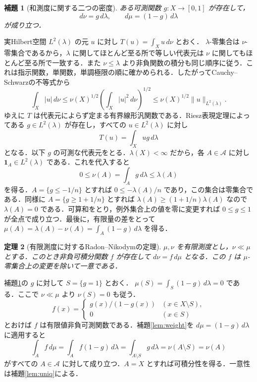 \documentclass[a5paper,10pt,onecolumn]{jsarticle}
\makeatletter
\theoremstyle{mathnotetheorem}
\newtheorem{theorem}{定理}[section]
\newtheorem{lemma}[theorem]{補題}
\renewcommand{\proofname}{証明}
\renewenvironment{proof}[1][\proofname]{%
  \par\pushQED{\qed}\normalfont\topsep4\p@\@plus2\p@\relax
  \trivlist\item[\hskip\labelsep\bfseries #1]\ignorespaces
}{\popQED\endtrivlist\@endpefalse}
\makeatother
\begin{document}
\begin{lemma}[和測度に関する二つの密度]\label{lem:sum}
ある可測関数 $g:X\to[0,1]$ が存在して，
\[
                 d\nu=g\,d\lambda,\qquad d\mu=(1-g)\,d\lambda
\]
が成り立つ．
\end{lemma}
\begin{proof}
実Hilbert空間 $L^2(\lambda)$ の元 $u$ に対し $T(u)=\int_X u\,d\nu$ とおく．
$\lambda$-零集合は $\nu$-零集合であるから，$\lambda$ に関してほとんど至る所で等しい代表元は $\nu$ に関してもほとんど至る所で一致する．また $\nu\le\lambda$ より非負関数の積分も同じ順序に従う．これは指示関数，単関数，単調極限の順に確かめられる．したがってCauchy--Schwarzの不等式から
\[
      \int_X |u|\,d\nu
       \le \nu(X)^{1/2}\left(\int_X |u|^2\,d\nu\right)^{1/2}
       \le \nu(X)^{1/2}\|u\|_{L^2(\lambda)} .
\]
ゆえに $T$ は代表元によらず定まる有界線形汎関数である．Riesz表現定理によってある $g\in L^2(\lambda)$ が存在し，すべての $u\in L^2(\lambda)$ に対し
\[
                    T(u)=\int_X ug\,d\lambda
\]
となる．以下 $g$ の可測な代表元をとる．$\lambda(X)<\infty$ だから，各 $A\in\mathcal A$ に対し $\mathbf1_A\in L^2(\lambda)$ である．これを代入すると
\[
             0\le \nu(A)=\int_A g\,d\lambda\le\lambda(A)
\]
を得る．$A=\{g\le-1/n\}$ とすれば $0\le-\lambda(A)/n$ であり，この集合は零集合である．同様に $A=\{g\ge1+1/n\}$ とすれば $\lambda(A)\ge(1+1/n)\lambda(A)$ なので $\lambda(A)=0$ である．可算和をとり，例外集合上の値を零に変更すれば $0\le g\le1$ が全点で成り立つ．最後に，有限量の差をとって
$\mu(A)=\lambda(A)-\nu(A)=\int_A(1-g)\,d\lambda$ を得る．
\end{proof}

\begin{theorem}[有限測度に対するRadon--Nikodymの定理]\label{thm:finite}
$\mu,\nu$ を有限測度とし，$\nu\ll\mu$ とする．このとき非負可積分関数 $f$ が存在して $d\nu=f\,d\mu$ となる．この $f$ は $\mu$-零集合上の変更を除いて一意である．
\end{theorem}
\begin{proof}
補題\ref{lem:sum}の $g$ に対して $S=\{g=1\}$ とおく．
$\mu(S)=\int_S(1-g)\,d\lambda=0$ である．ここで $\nu\ll\mu$ より $\nu(S)=0$ も従う．
\[
 f(x)=\begin{cases}
  g(x)/(1-g(x)) & (x\in X\setminus S),\\
  0 & (x\in S)
 \end{cases}
\]
とおけば $f$ は有限値非負可測関数である．補題\ref{lem:weight}を $d\mu=(1-g)\,d\lambda$ に適用すると
\[
 \int_A f\,d\mu=\int_A f(1-g)\,d\lambda
    =\int_{A\setminus S} g\,d\lambda=\nu(A\setminus S)=\nu(A)
\]
がすべての $A\in\mathcal A$ に対して成り立つ．$A=X$ とすれば可積分性を得る．一意性は補題\ref{lem:uniq}による．
\end{proof}
\end{document}
